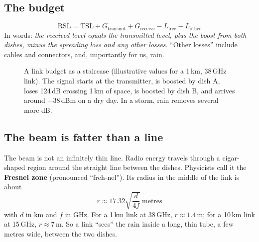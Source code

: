 \documentclass[11pt,a4paper]{article}
\begin{document}
\subsection{The budget}

\begin{equation}
\text{RSL} = \text{TSL} + G_\text{transmit} + G_\text{receive} - L_\text{free} - L_\text{other}
\label{eq:budget}
\end{equation}
In words: \emph{the received level equals the transmitted level, plus the boost from both dishes,
minus the spreading loss and any other losses}. ``Other losses'' include cables and connectors, and,
importantly for us, rain.

\begin{figure}[h]
\centering
{}
\caption{A link budget as a staircase (illustrative values for a 1\,km, 38\,GHz link). The signal
starts at the transmitter, is boosted by dish A, loses 124\,dB crossing 1\,km of space, is boosted by
dish B, and arrives around $-38$\,dBm on a dry day. In a storm, rain removes several more dB.}
\end{figure}

\subsection{The beam is fatter than a line}

The beam is not an infinitely thin line. Radio energy travels through a cigar-shaped region around
the straight line between the dishes. Physicists call it the \textbf{Fresnel zone} (pronounced
``freh-nel''). Its radius in the middle of the link is about
\begin{equation}
r \approx 17.32\sqrt{\frac{d}{4f}} \ \text{metres}
\end{equation}
with $d$ in km and $f$ in GHz. For a 1\,km link at 38\,GHz, $r \approx 1.4$\,m; for a 10\,km link at
15\,GHz, $r \approx 7$\,m. So a link ``sees'' the rain inside a long, thin tube, a few metres wide, between
the two dishes.
\end{document}

